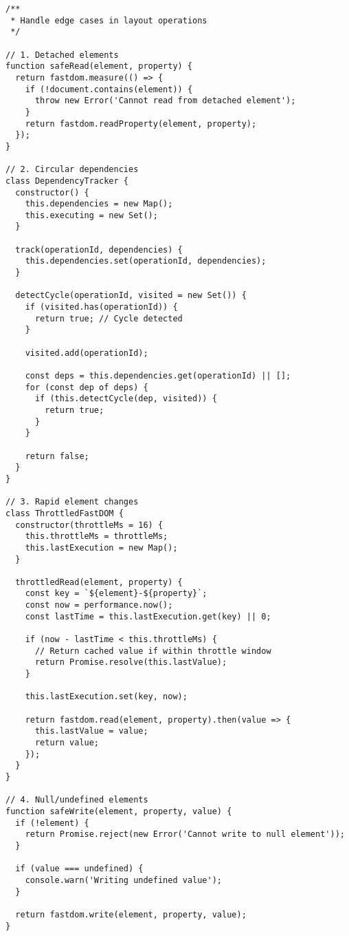 \documentclass[11pt]{article}
\begin{document}
\begin{verbatim}
/**
 * Handle edge cases in layout operations
 */

// 1. Detached elements
function safeRead(element, property) {
  return fastdom.measure(() => {
    if (!document.contains(element)) {
      throw new Error('Cannot read from detached element');
    }
    return fastdom.readProperty(element, property);
  });
}

// 2. Circular dependencies
class DependencyTracker {
  constructor() {
    this.dependencies = new Map();
    this.executing = new Set();
  }
  
  track(operationId, dependencies) {
    this.dependencies.set(operationId, dependencies);
  }
  
  detectCycle(operationId, visited = new Set()) {
    if (visited.has(operationId)) {
      return true; // Cycle detected
    }
    
    visited.add(operationId);
    
    const deps = this.dependencies.get(operationId) || [];
    for (const dep of deps) {
      if (this.detectCycle(dep, visited)) {
        return true;
      }
    }
    
    return false;
  }
}

// 3. Rapid element changes
class ThrottledFastDOM {
  constructor(throttleMs = 16) {
    this.throttleMs = throttleMs;
    this.lastExecution = new Map();
  }
  
  throttledRead(element, property) {
    const key = `${element}-${property}`;
    const now = performance.now();
    const lastTime = this.lastExecution.get(key) || 0;
    
    if (now - lastTime < this.throttleMs) {
      // Return cached value if within throttle window
      return Promise.resolve(this.lastValue);
    }
    
    this.lastExecution.set(key, now);
    
    return fastdom.read(element, property).then(value => {
      this.lastValue = value;
      return value;
    });
  }
}

// 4. Null/undefined elements
function safeWrite(element, property, value) {
  if (!element) {
    return Promise.reject(new Error('Cannot write to null element'));
  }
  
  if (value === undefined) {
    console.warn('Writing undefined value');
  }
  
  return fastdom.write(element, property, value);
}
\end{verbatim}
\end{document}
